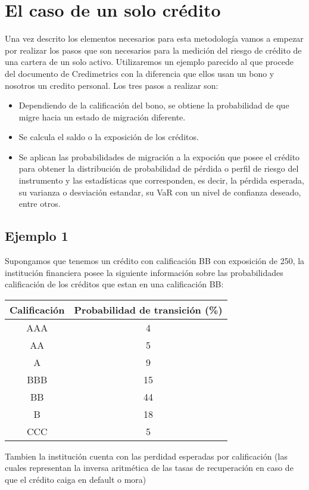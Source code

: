 \documentclass[
  12pt,
]{krantz}
\theoremstyle{definition}
\theoremstyle{definition}
\theoremstyle{definition}
\theoremstyle{remark}
\begin{document}
\hypertarget{el-caso-de-un-solo-credito}{%
\section{El caso de un solo crédito}\label{el-caso-de-un-solo-credito}}

Una vez descrito los elementos necesarios para esta metodología vamos a empezar por realizar los pasos que son necesarios para la medición del riesgo de crédito de una cartera de un solo activo. Utilizaremos un ejemplo parecido al que procede del documento de Credimetrics con la diferencia que ellos usan un bono y nosotros un credito personal. Los tres pasos a realizar son:

\begin{itemize}
\item
  Dependiendo de la calificación del bono, se obtiene la probabilidad de que migre hacia un estado de migración diferente.
\item
  Se calcula el saldo o la exposición de los créditos.
\item
  Se aplican las probabilidades de migración a la expoción que posee el crédito para obtener la distribución de probabilidad de pérdida o perfil de riesgo del instrumento y las estadísticas que corresponden, es decir, la pérdida esperada, su varianza o desviación estandar, su VaR con un nivel de confianza deseado, entre otros.
\end{itemize}

\hypertarget{ejemplo-1}{%
\subsection{Ejemplo 1}\label{ejemplo-1}}

Supongamos que tenemos un crédito con calificación BB con exposición de 250, la institución financiera posee la siguiente información sobre las probabilidades calificación de los créditos que estan en una calificación BB:

\begin{longtable}[]{@{}cc@{}}
\toprule
Calificación & Probabilidad de transición (\%)\tabularnewline
\midrule
\endhead
AAA & 4\tabularnewline
AA & 5\tabularnewline
A & 9\tabularnewline
BBB & 15\tabularnewline
BB & 44\tabularnewline
B & 18\tabularnewline
CCC & 5\tabularnewline
\bottomrule
\end{longtable}

Tambien la institución cuenta con las perdidad esperadas por calificación (las cuales representan la inversa aritmética de las tasas de recuperación en caso de que el crédito caiga en default o mora)
\end{document}
